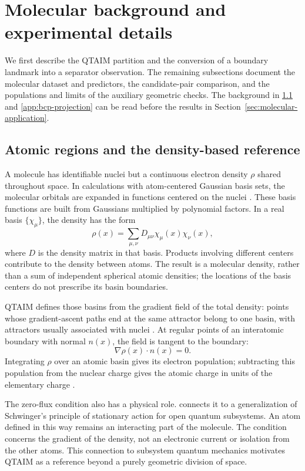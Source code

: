 \section{Molecular background and experimental details}
\label{app:molecular-background}

We first describe the QTAIM partition and the conversion of a boundary landmark into a separator observation. The remaining subsections document the molecular dataset and predictors, the candidate-pair comparison, and the populations and limits of the auxiliary geometric checks. The background in \ref{app:qtaim-background} and \ref{app:bcp-projection} can be read before the results in Section~\ref{sec:molecular-application}.

\subsection{Atomic regions and the density-based reference}
\label{app:qtaim-background}

A molecule has identifiable nuclei but a continuous electron density $\rho$ shared throughout space. In calculations with atom-centered Gaussian basis sets, the molecular orbitals are expanded in functions centered on the nuclei \citep{Boys1950,WeigendAhlrichs2005}. These basis functions are built from Gaussians multiplied by polynomial factors. In a real basis $\{\chi_\mu\}$, the density has the form
\[
\rho(x)=\sum_{\mu,\nu}D_{\mu\nu}\chi_\mu(x)\chi_\nu(x),
\]
where $D$ is the density matrix in that basis. Products involving different centers contribute to the density between atoms. The result is a molecular density, rather than a sum of independent spherical atomic densities; the locations of the basis centers do not prescribe its basin boundaries.

QTAIM defines those basins from the gradient field of the total density: points whose gradient-ascent paths end at the same attractor belong to one basin, with attractors usually associated with nuclei \citep{Bader1980,Bader1990}. At regular points of an interatomic boundary with normal $n(x)$, the field is tangent to the boundary:
\[
\nabla\rho(x)\cdot n(x)=0.
\]
Integrating $\rho$ over an atomic basin gives its electron population; subtracting this population from the nuclear charge gives the atomic charge in units of the elementary charge \citep{Bader1990}.

The zero-flux condition also has a physical role. \citet{Bader1994} connects it to a generalization of Schwinger's principle of stationary action for open quantum subsystems. An atom defined in this way remains an interacting part of the molecule. The condition concerns the gradient of the density, not an electronic current or isolation from the other atoms. This connection to subsystem quantum mechanics motivates QTAIM as a reference beyond a purely geometric division of space.

